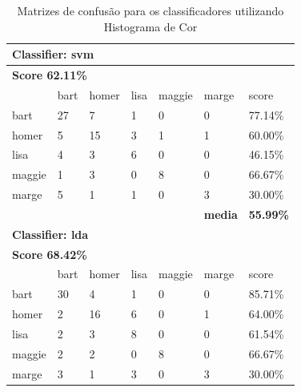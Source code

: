 \documentclass[journal]{IEEEtran}
\begin{document}
\begin{table}[!htb]
\centering
\caption{Matrizes de confusão para os classificadores utilizando Histograma de Cor}
\label{tbl:colorhistogram}
\small
\singlespacing
\begin{tabular}{l|l|l|l|l|l|l}
\hline
\multicolumn{7}{l}{\textbf{Classifier: svm}}                                                \\ \hline
\multicolumn{7}{l}{\textbf{Score 62.11\%}}                                                  \\ \hline
          & bart      & homer     & lisa      & maggie    & marge          & score            \\ \hline
bart      & 27        & 7         & 1         & 0         & 0              & 77.14\%          \\ \hline
homer     & 5         & 15        & 3         & 1         & 1              & 60.00\%          \\ \hline
lisa      & 4         & 3         & 6         & 0         & 0              & 46.15\%          \\ \hline
maggie    & 1         & 3         & 0         & 8         & 0              & 66.67\%          \\ \hline
marge     & 5         & 1         & 1         & 0         & 3              & 30.00\%          \\ \hline
          &           &           & \textbf{} & \textbf{} & \textbf{media} & \textbf{55.99\%} \\ \hline
\multicolumn{7}{l}{\textbf{Classifier: lda}}                                                \\ \hline
\multicolumn{7}{l}{\textbf{Score 68.42\%}}                                                  \\ \hline
          & bart      & homer     & lisa      & maggie    & marge          & score            \\ \hline
bart      & 30        & 4         & 1         & 0         & 0              & 85.71\%          \\ \hline
homer     & 2         & 16        & 6         & 0         & 1              & 64.00\%          \\ \hline
lisa      & 2         & 3         & 8         & 0         & 0              & 61.54\%          \\ \hline
maggie    & 2         & 2         & 0         & 8         & 0              & 66.67\%          \\ \hline
marge     & 3         & 1         & 3         & 0         & 3              & 30.00\%          \\ \hline

\end{tabular}
\end{table}
\end{document}

